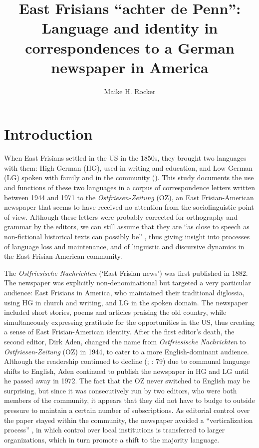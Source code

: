 \documentclass[output=paper]{langsci/langscibook}
\author{Maike H. Rocker\affiliation{The Pennsylvania State University}}
\title[East Frisians ``achter de Penn'']{East Frisians ``achter de Penn'': Language and identity in correspondences to a German newspaper in America}
\begin{document}
\maketitle 


\section{Introduction} %
\label{sec:rocker:1}

When East Frisians settled in the US in the 1850s, they brought two languages with them: High German (HG), used in writing and education, and Low German (LG) spoken with family and in the community (\citealt{Schnucker1917, Frizzel1992}). This study documents the use and functions of these two languages in a corpus of correspondence letters written between 1944 and 1971 to the \textit{Ostfriesen-Zeitung} (OZ), an East Frisian-American newspaper that seems to have received no attention from the sociolinguistic point of view. Although these letters were probably corrected for orthography and grammar by the editors, we can still assume that they are “as close to speech as non-fictional historical texts can possibly be” \citep[156]{Elspass2012}, thus giving insight into processes of language loss and maintenance, and of linguistic and discursive dynamics in the East Frisian-American community.

The \textit{Ostfriesische Nachrichten} (‘East Frisian news’) was first published in 1882. The newspaper was explicitly non-denominational but targeted a very particular audience: East Frisians in America, who maintained their traditional diglossia, using HG in church and writing, and LG in the spoken domain. The newspaper included short stories, poems and articles praising the old country, while simultaneously expressing gratitude for the opportunities in the US, thus creating a sense of East Frisian-American identity. After the first editor’s death, the second editor, Dirk Aden, changed the name from \textit{Ostfriesische Nachrichten} to \textit{Ostfriesen-Zeitung} (OZ) in 1944, to cater to a more English-dominant audience. Although the readership continued to decline (\citealt{Monahan1971}; \citealt{Lindaman2004}: 79) due to communal language shifts to English, Aden continued to publish the newspaper in HG and LG until he passed away in 1972. The fact that the OZ never switched to English may be surprising, but since it was consecutively run by two editors, who were both members of the community, it appears that they did not have to budge to outside pressure to maintain a certain number of subscriptions. As editorial control over the paper stayed within the community, the newspaper avoided a “verticalization process” \citep{Salmons1983}, in which control over local institutions is transferred to larger organizations, which in turn promote a shift to the majority language. 
\end{document}

